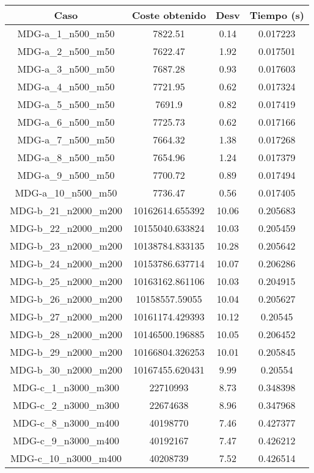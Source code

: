 \documentclass{article}
\begin{document}
\begin{table}[H]
	\centering
	\begin{tabular}{|cccc|}
		\hline
		Caso & Coste obtenido & Desv & Tiempo (s)\\ \hline
		MDG-a\_1\_n500\_m50 & 7822.51 & 0.14 & 0.017223\\
		MDG-a\_2\_n500\_m50 & 7622.47 & 1.92 & 0.017501\\
		MDG-a\_3\_n500\_m50 & 7687.28 & 0.93 & 0.017603\\
		MDG-a\_4\_n500\_m50 & 7721.95 & 0.62 & 0.017324\\
		MDG-a\_5\_n500\_m50 & 7691.9 & 0.82 & 0.017419\\
		MDG-a\_6\_n500\_m50 & 7725.73 & 0.62 & 0.017166\\
		MDG-a\_7\_n500\_m50 & 7664.32 & 1.38 & 0.017268\\
		MDG-a\_8\_n500\_m50 & 7654.96 & 1.24 & 0.017379\\
		MDG-a\_9\_n500\_m50 & 7700.72 & 0.89 & 0.017494\\
		MDG-a\_10\_n500\_m50 & 7736.47 & 0.56 & 0.017405\\
		MDG-b\_21\_n2000\_m200 & 10162614.655392 & 10.06 & 0.205683\\
		MDG-b\_22\_n2000\_m200 & 10155040.633824 & 10.03 & 0.205459\\
		MDG-b\_23\_n2000\_m200 & 10138784.833135 & 10.28 & 0.205642\\
		MDG-b\_24\_n2000\_m200 & 10153786.637714 & 10.07 & 0.206286\\
		MDG-b\_25\_n2000\_m200 & 10163162.861106 & 10.03 & 0.204915\\
		MDG-b\_26\_n2000\_m200 & 10158557.59055 & 10.04 & 0.205627\\
		MDG-b\_27\_n2000\_m200 & 10161174.429393 & 10.12 & 0.20545\\
		MDG-b\_28\_n2000\_m200 & 10146500.196885 & 10.05 & 0.206452\\
		MDG-b\_29\_n2000\_m200 & 10166804.326253 & 10.01 & 0.205845\\
		MDG-b\_30\_n2000\_m200 & 10167455.620431 & 9.99 & 0.20554\\
		MDG-c\_1\_n3000\_m300 & 22710993 & 8.73 & 0.348398\\
		MDG-c\_2\_n3000\_m300 & 22674638 & 8.96 & 0.347968\\
		MDG-c\_8\_n3000\_m400 & 40198770 & 7.46 & 0.427377\\
		MDG-c\_9\_n3000\_m400 & 40192167 & 7.47 & 0.426212\\
		MDG-c\_10\_n3000\_m400 & 40208739 & 7.52 & 0.426514\\

\end{tabular}
\end{table}
\end{document}
